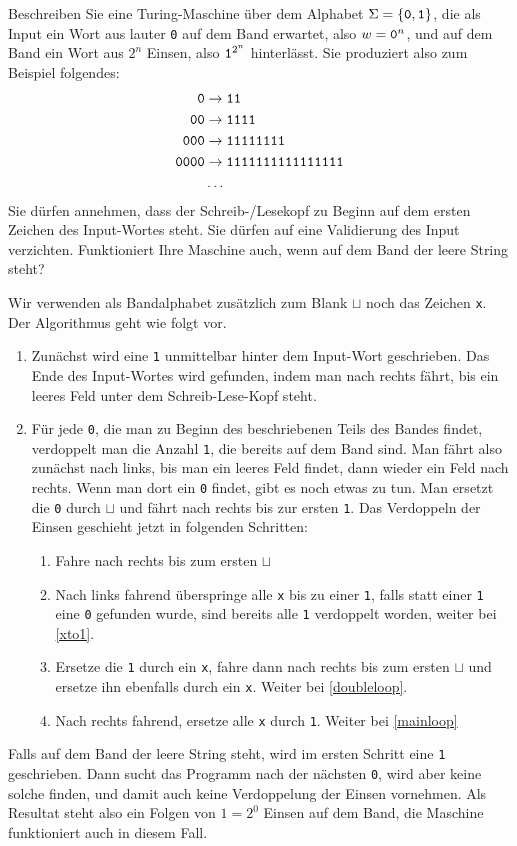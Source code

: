 Beschreiben Sie eine Turing-Maschine über dem Alphabet
$\Sigma=\{\text{\tt 0},\text{\tt 1}\}$, die als Input ein Wort
aus lauter {\tt 0} auf dem Band erwartet, also $w=\text{\tt 0}^n$,
und auf dem Band ein Wort aus $2^n$ Einsen, also $\text{\tt 1}^{2^n}$ hinterlässt. Sie
produziert also zum Beispiel folgendes:
\begin{align*}
\text{\tt 0}&\rightarrow\text{\tt 11}\\
\text{\tt 00}&\rightarrow\text{\tt 1111}\\
\text{\tt 000}&\rightarrow\text{\tt 11111111}\\
\text{\tt 0000}&\rightarrow\text{\tt 1111111111111111}\\
&\dots
\end{align*}
Sie dürfen annehmen, dass der Schreib-/Lesekopf zu Beginn auf dem
ersten Zeichen des Input-Wortes steht. Sie dürfen auf eine
Validierung des Input verzichten. Funktioniert Ihre Maschine auch,
wenn auf dem Band der leere String steht?

\begin{loesung}
Wir verwenden als Bandalphabet zusätzlich zum Blank $\sqcup$ noch
das Zeichen {\tt x}. Der Algorithmus geht wie folgt vor.
\begin{enumerate}
\item Zunächst
wird eine {\tt 1} unmittelbar hinter dem Input-Wort geschrieben.
Das Ende des Input-Wortes wird gefunden, indem man nach rechts fährt,
bis ein leeres Feld unter dem Schreib-Lese-Kopf steht.
\item \label{mainloop}Für jede {\tt 0}, die man zu Beginn des beschriebenen
Teils des Bandes findet, verdoppelt man die Anzahl {\tt 1}, die
bereits auf dem Band sind. Man fährt also zunächst nach links,
bis man ein leeres Feld findet, dann wieder ein Feld nach rechts.
Wenn man dort ein {\tt 0} findet, gibt es noch etwas zu tun. Man
ersetzt die {\tt 0} durch $\sqcup$ und fährt nach rechts bis
zur ersten {\tt 1}. Das Verdoppeln der Einsen geschieht jetzt in
folgenden Schritten:
\begin{enumerate}
\item Fahre nach rechts bis zum ersten $\sqcup$
\item \label{doubleloop}Nach links fahrend überspringe alle {\tt x} bis zu einer {\tt 1},
falls statt einer {\tt 1} eine {\tt 0} gefunden wurde, sind bereits alle
{\tt 1} verdoppelt worden, weiter bei \ref{xto1}.
\item Ersetze die {\tt 1} durch ein
{\tt x}, fahre dann nach rechts bis zum ersten $\sqcup$ und ersetze
ihn ebenfalls durch ein {\tt x}. Weiter bei \ref{doubleloop}.
\item \label{xto1}Nach rechts fahrend, ersetze alle {\tt x} durch {\tt 1}.
Weiter bei \ref{mainloop}
\end{enumerate}
\end{enumerate}
Falls auf dem Band der leere String steht, wird im ersten Schritt eine
{\tt 1} geschrieben. Dann sucht das Programm nach der nächsten {\tt 0},
wird aber keine solche finden, und damit auch keine Verdoppelung der
Einsen vornehmen. Als Resultat steht also ein Folgen von $1=2^0$ Einsen
auf dem Band, die Maschine funktioniert auch in diesem Fall.
\end{loesung}
